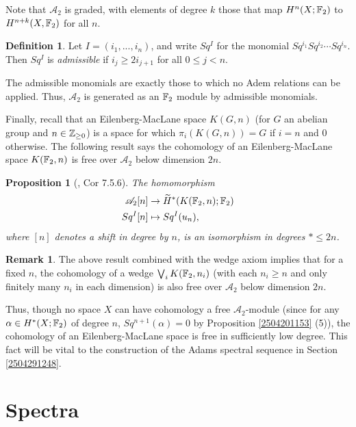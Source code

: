 \documentclass[11pt, titlepage]{article} %
\def\bb{\ensuremath\mathbb}
\def\inte{\ensuremath\mathbb{Z}}
\def\A{\ensuremath{\mathscr{A}_2}}
\numberwithin{equation}{subsection}
\theoremstyle{plain}
\newtheorem{proposition}[theorem]{Proposition}
\theoremstyle{definition}
\newtheorem{definition}[theorem]{Definition}
\newtheorem{remark}[theorem]{Remark}
\begin{document}
Note that \(\mathscr A_2\) is graded, with elements of degree \(k\) those that map \(H^n(X; \bb{F}_2)\) to \(H^{n+k}(X, \bb{F}_2)\) for all \(n\). 

\begin{definition}
Let \(I=(i_1, ..., i_n)\), and write \(Sq^I\) for the monomial \(Sq^{i_1}Sq^{i_2}\cdots Sq^{i_n}\). Then \(Sq^I\) is \textit{admissible} if \(i_j\geq 2i_{j+1}\) for all \(0\leq j < n\). 
\end{definition}

The admissible monomials are exactly those to which no Adem relations can be applied. Thus, \(\A\) is generated as an \(\bb{F}_2\) module by admissible monomials.

Finally, recall that an Eilenberg-MacLane space \(K(G, n)\) (for \(G\) an abelian group and \(n \in \inte_{\geq 0}\)) is a space for which \(\pi_i(K(G, n))=G\) if \(i=n\) and \(0\) otherwise. The following result says the cohomology of an Eilenberg-MacLane space \(K(\bb{F}_2, n)\) is free over \(\A\) below dimension \(2n\).

\begin{proposition}[{\autocite{rognes2}, Cor 7.5.6}]
The homomorphism
\begin{align*}
\A[n] &\to \widetilde H^*(K(\bb{F}_2, n); \bb{F}_2)\\
Sq^I[n] &\mapsto Sq^I(u_n),
\end{align*}
where \([n]\) denotes a shift in degree by \(n\), is an isomorphism in degrees \(*\leq 2n\). 
\end{proposition}

\begin{remark}\label{2505061746gettingclosenow}
The above result combined with the wedge axiom implies that for a fixed \(n\), the cohomology of a wedge \(\bigvee_i K(\bb{F}_2, n_i)\) (with each \(n_i \geq n\) and only finitely many \(n_i\) in each dimension) is also free over \(\A\) below dimension \(2n\).
\end{remark}

Thus, though no space \(X\) can have cohomology a free \(\A\)-module (since for any \(\alpha \in H^*(X;\bb{F}_2)\) of degree \(n\), \(Sq^{n+1}(\alpha)=0\) by Proposition \ref{2504201153} (5)), the cohomology of an Eilenberg-MacLane space is free in sufficiently low degree. This fact will be vital to the construction of the Adams spectral sequence in Section \ref{2504291248}. 

\section{Spectra}
\end{document}
